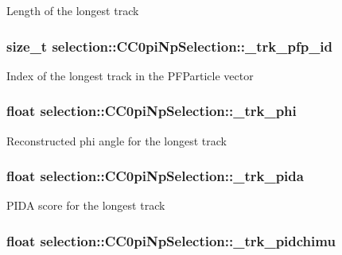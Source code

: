 Length of the longest track \hypertarget{classselection_1_1CC0piNpSelection_a641e7e656a28a5b31a5c8ab21dad9d3b}{
\subsubsection[{\-\_\-trk\-\_\-pfp\-\_\-id}]{\setlength{\rightskip}{0pt plus 5cm}size\-\_\-t selection\-::\-C\-C0pi\-Np\-Selection\-::\-\_\-trk\-\_\-pfp\-\_\-id\hspace{0.3cm}{\ttfamily [private]}}}\label{classselection_1_1CC0piNpSelection_a641e7e656a28a5b31a5c8ab21dad9d3b}
Index of the longest track in the P\-F\-Particle vector \hypertarget{classselection_1_1CC0piNpSelection_a85a6029e249e3ff20ea6d8eaabf22142}{
\subsubsection[{\-\_\-trk\-\_\-phi}]{\setlength{\rightskip}{0pt plus 5cm}float selection\-::\-C\-C0pi\-Np\-Selection\-::\-\_\-trk\-\_\-phi\hspace{0.3cm}{\ttfamily [private]}}}\label{classselection_1_1CC0piNpSelection_a85a6029e249e3ff20ea6d8eaabf22142}
Reconstructed phi angle for the longest track \hypertarget{classselection_1_1CC0piNpSelection_af0fe49227e33b3f46015a821de58ba1f}{
\subsubsection[{\-\_\-trk\-\_\-pida}]{\setlength{\rightskip}{0pt plus 5cm}float selection\-::\-C\-C0pi\-Np\-Selection\-::\-\_\-trk\-\_\-pida\hspace{0.3cm}{\ttfamily [private]}}}\label{classselection_1_1CC0piNpSelection_af0fe49227e33b3f46015a821de58ba1f}
P\-I\-D\-A score for the longest track \hypertarget{classselection_1_1CC0piNpSelection_a74ddf5622f3ee32110e9342361020a89}{
\subsubsection[{\-\_\-trk\-\_\-pidchimu}]{\setlength{\rightskip}{0pt plus 5cm}float selection\-::\-C\-C0pi\-Np\-Selection\-::\-\_\-trk\-\_\-pidchimu\hspace{0.3cm}{\ttfamily [private]}}}\label{classselection_1_1CC0piNpSelection_a74ddf5622f3ee32110e9342361020a89}
